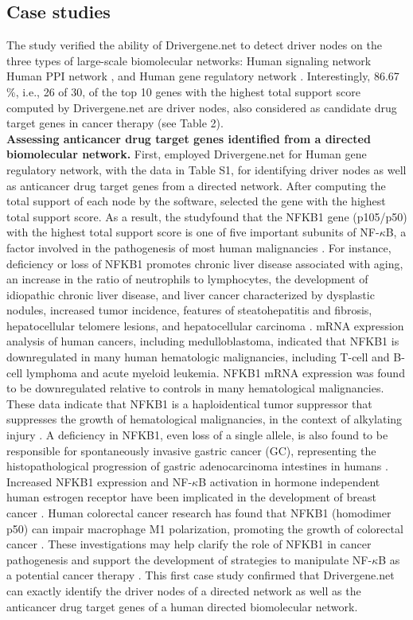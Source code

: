 \documentclass[5p,,preprint,12pt]{elsarticle}
\begin{document}
\subsection{Case studies} 
The study verified the ability of Drivergene.net to detect driver nodes on the three types of large-scale biomolecular networks: Human signaling network \cite{37} Human PPI network \cite{36}, and Human gene regulatory network \cite{35}. Interestingly, 86.67 \%, i.e., 26 of 30, of the top 10 genes with the highest total support score computed by Drivergene.net are driver nodes, also considered as candidate drug target genes in cancer therapy (see Table 2). \\
\textbf{Assessing anticancer drug target genes identified from a directed biomolecular network.}  First, employed Drivergene.net for Human gene regulatory network, with the data in Table S1, for identifying driver nodes as well as anticancer drug target genes from a directed network. After computing the total support of each node by the software, selected the gene with the highest total support score. As a result, the studyfound that the NFKB1 gene (p105/p50) with the highest total support score is one of five important subunits of NF-$\kappa$B, a factor involved in the pathogenesis of most human malignancies \cite{42,43}. For instance, deficiency or loss of NFKB1 promotes chronic liver disease associated with aging, an increase in the ratio of neutrophils to lymphocytes, the development of idiopathic chronic liver disease, and liver cancer characterized by dysplastic nodules, increased tumor incidence, features of steatohepatitis and fibrosis, hepatocellular telomere lesions, and hepatocellular carcinoma \cite{44}. mRNA expression analysis of human cancers, including medulloblastoma, indicated that NFKB1 is downregulated in many human hematologic malignancies, including T-cell and B-cell lymphoma and acute myeloid leukemia. NFKB1 mRNA expression was found to be downregulated relative to controls in many hematological malignancies. These data indicate that NFKB1 is a haploidentical tumor suppressor that suppresses the growth of hematological malignancies, in the context of alkylating injury \cite{45}. A deficiency in NFKB1, even loss of a single allele, is also found to be responsible for spontaneously invasive gastric cancer (GC), representing the histopathological progression of gastric adenocarcinoma intestines in humans \cite{46}. Increased NFKB1 expression and NF-$\kappa$B activation in hormone independent human estrogen receptor have been implicated in the development of breast cancer \cite{42,47}. Human colorectal cancer research has found that NFKB1 (homodimer p50) can impair macrophage M1 polarization, promoting the growth of colorectal cancer \cite{48,49}. These investigations may help clarify the role of NFKB1 in cancer pathogenesis and support the development of strategies to manipulate NF-$\kappa$B as a potential cancer therapy \cite{42}. This first case study confirmed that  Drivergene.net can exactly identify the driver nodes of a directed network as well as the anticancer drug target genes of a human directed biomolecular network.\\
\end{document}
